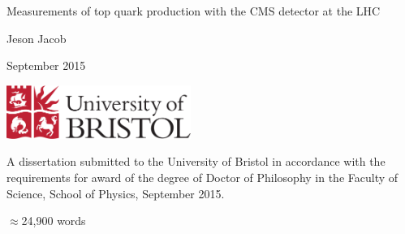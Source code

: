 \begin{titlepage}
	
	\begin{center}
		
		\vspace*{1cm}
		
		\Huge
		
		Measurements of top quark production with the CMS detector at the LHC

		\vspace{0.5cm}
		
		\large
		
		Jeson Jacob
		
		\vspace{0.5cm}
		
		September 2015 %
		
		\vspace{1.5cm}
		
		\includegraphics[width=60mm]{Images/UnivShield}
		
		\vfill
		
		\normalsize
	\end{center}
	A dissertation submitted to the University of Bristol in accordance with the
	requirements for award of the degree of Doctor of Philosophy in the Faculty of
	Science, School of Physics, September 2015.

	\begin{flushright}
		$\approx$24,900 words
	\end{flushright}

\end{titlepage}